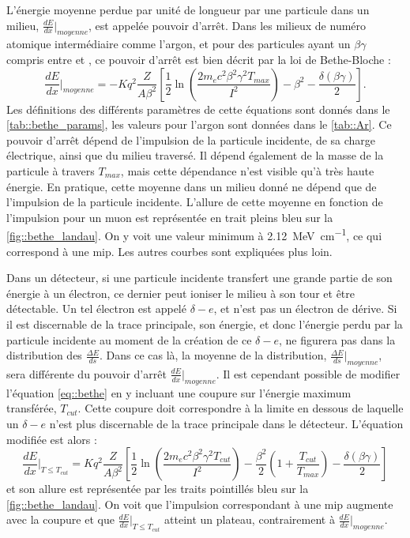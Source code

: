         L'énergie moyenne perdue par unité de longueur par une particule dans un milieu, $\frac{dE}{dx}\rvert_{moyenne}$, est appelée pouvoir d'arrêt. Dans les milieux de numéro atomique intermédiaire comme l'argon, et pour des particules ayant un $\beta\gamma$ compris entre  et , ce pouvoir d'arrêt est bien décrit par la loi de Bethe-Bloche\cite{pdg2018} :
        \begin{equation}
          \frac{dE}{dx}\biggr\rvert_{moyenne} = -Kq^2 \frac{Z}{A\beta^2}\left[\frac{1}{2}\ln\left(\frac{2m_ec^2\beta^2\gamma^2T_{max}}{I^2}\right)-\beta^2-\frac{\delta(\beta\gamma)}{2} \right]\label{eq::bethe}.
        \end{equation}
        Les définitions des différents paramètres de cette équations sont donnés dans le \autoref{tab::bethe_params}, les valeurs pour l'argon sont données dans le \autoref{tab::Ar}. Ce pouvoir d'arrêt dépend de l'impulsion de la particule incidente, de sa charge électrique, ainsi que du milieu traversé. Il dépend également de la masse de la particule à travers $T_{max}$, mais cette dépendance n'est visible qu'à très haute énergie\cite{pdg2018}. En pratique, cette moyenne dans un milieu donné ne dépend que de l'impulsion de la particule incidente. L'allure de cette moyenne en fonction de l'impulsion pour un muon est représentée en trait pleins bleu sur la \autoref{fig::bethe_landau}. On y voit une valeur minimum à \SI{2.12}{\mega\electronvolt\per\centi\meter}, ce qui correspond à une \gls{mip}. Les autres courbes sont expliquées plus loin.
        
        Dans un détecteur, si une particule incidente transfert une grande partie de son énergie à un électron, ce dernier peut ioniser le milieu à son tour et être détectable. Un tel électron est appelé $\delta-e$, et n'est pas un électron de dérive. Si il est discernable de la trace principale, son énergie, et donc l'énergie perdu par la particule incidente au moment de la création de ce $\delta-e$, ne figurera pas dans la distribution des $\frac{\Delta E}{ds}$. Dans ce cas là, la moyenne de la distribution, $\frac{\Delta E}{ds}\rvert_{moyenne}$, sera différente du pouvoir d'arrêt $\frac{dE}{dx}\rvert_{moyenne}$. Il est cependant possible de modifier l'équation \eqref{eq::bethe} en y incluant une coupure sur l'énergie maximum transférée, $T_{cut}$\cite{pdg2018}. Cette coupure doit correspondre à la limite en dessous de laquelle un $\delta-e$ n'est plus discernable de la trace principale dans le détecteur. L'équation modifiée est alors :
        \begin{equation}\label{eq::bethe_tcut}
          \frac{dE}{dx}\biggr\rvert_{T\leq T_{cut}} = Kq^2 \frac{Z}{A\beta^2}\left[\frac{1}{2}\ln\left(\frac{2m_ec^2\beta^2\gamma^2T_{cut}}{I^2}\right)-\frac{\beta^2}{2}\left(1+\frac{T_{cut}}{T_{max}}\right)-\frac{\delta(\beta\gamma)}{2} \right]
        \end{equation}
        et son allure est représentée par les traits pointillés bleu sur la \autoref{fig::bethe_landau}. On voit que l'impulsion correspondant à une \gls{mip} augmente avec la coupure et que $\frac{dE}{dx}\rvert_{T\leq T_{cut}}$ atteint un plateau, contrairement à $\frac{dE}{dx}\rvert_{moyenne}$.
        
